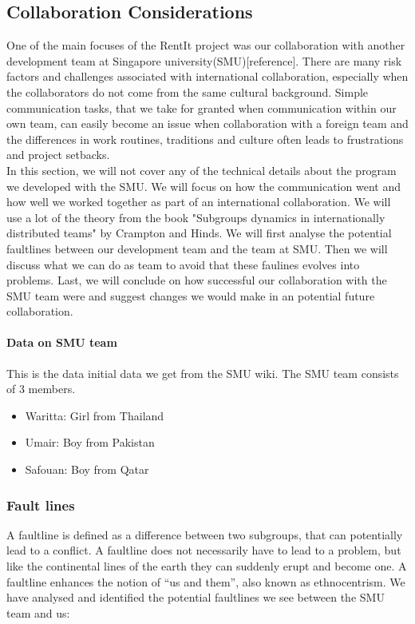 \documentclass[a4paper,11pt,report]{article}
\begin{document}
{\subsection{Collaboration Considerations}
One of the main focuses of the RentIt project was our collaboration with another development team at Singapore university(SMU)[reference]. There are many risk factors and challenges associated with international collaboration, especially when the collaborators do not come from the same cultural background. Simple communication tasks, that we take for granted when communication within our own team, can easily become an issue when collaboration with a foreign team and the differences in work routines, traditions and culture often leads to frustrations and project setbacks. \\

In this section, we will not cover any of the technical details about the program we developed with the SMU. We will focus on how the communication went and how well we worked together as part of an international collaboration. We will use a lot of the theory from the book "Subgroups dynamics in internationally distributed teams" by Crampton and Hinds. We will first analyse the potential faultlines\cite{smu} between our development team and the team at SMU. Then we will discuss what we can do as team to avoid that these faulines evolves into problems. Last, we will conclude on how successful our collaboration with the SMU team were and suggest changes we would make in an potential future collaboration.\\

\paragraph{Data on SMU team}

This is the data initial data we get from the SMU wiki. The SMU team consists of 3 members.\\

\begin{itemize}
\item Waritta: Girl from Thailand
\item Umair: Boy from Pakistan
\item Safouan: Boy from Qatar
\end{itemize}

\subsubsection{Fault lines}
A faultline is defined as a difference between two subgroups, that can potentially lead to a conflict. A faultline does not necessarily have to lead to a problem, but like the continental lines of the earth they can suddenly erupt and become one. A faultline enhances the notion of “us and them”, also known as ethnocentrism\cite{smu}. We have analysed and identified the potential faultlines we see between the SMU team and us:

}
\end{document}
